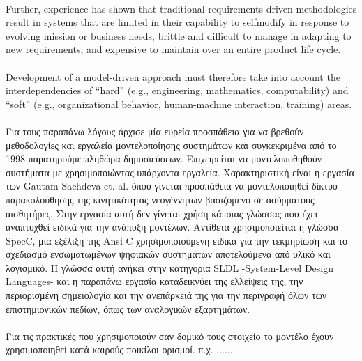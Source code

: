 \documentclass[a4paper,12pt,twoside]{report}
\begin{document}
{			\paragraph{}{Further, experience has shown that traditional requirements-driven methodologies result in systems that are limited in their capability to selfmodify in response to evolving mission or business needs, brittle and difficult to manage in adapting to new requirements, and expensive to maintain over an entire product life cycle.
			}
			
			\paragraph{} {Development of a model-driven approach must therefore take into account the interdependencies of “hard” (e.g., engineering, mathematics, computability) and “soft” (e.g., organizational behavior, human-machine interaction, training) areas. \cite{FoundationalConceptsMDSD}
			}
			
			
						
			\paragraph{} {Για τους παραπάνω λόγους άρχισε μία ευρεία προσπάθεια για να βρεθούν μεθοδολογίες και εργαλεία μοντελοποίησης συστημάτων και συγκεκριμένα από το 1998 παρατηρούμε πληθώρα δημοσιεύσεων. Επιχειρείται να μοντελοποθηθούν συστήματα με χρησιμοποιώντας υπάρχοντα εργαλεία. Χαρακτηριστική είναι η εργασία των Gautam Sachdeva et. al. \cite{SMWirelessSensorNetwork} όπου γίνεται προσπάθεια να μοντελοποιηθεί δίκτυο παρακολούθησης της κινητικότητας νεογέννητων βασιζόμενο σε ασύρματους αισθητήρες. Στην εργασία αυτή δεν γίνεται χρήση κάποιας γλώσσας που έχει αναπτυχθεί ειδικά για την ανάπυξη μοντέλων. Αντίθετα χρησιμοποιείται η γλώσσα SpecC, μία εξέλιξη της Ansi C χρησιμοποιούμενη ειδικά για την τεκμηρίωση και το σχεδιασμό ενσωματωμένων ψηφιακών συστημάτων αποτελούμενα από υλικό και λογισμικό. Η γλώσσα αυτή ανήκει στην κατηγορια SLDL -System-Level Design Languages- και η παραπάνω εργασία καταδεικνύει της ελλείψεις της, την περιορισμένη σημειολογία και την ανεπάρκειά της για την περιγραφή όλων των επιστημιονικών πεδίων, όπως των αναλογικών εξαρτημάτων.
			}
			
			\paragraph{} {Για τις πρακτικές που χρησιμοποιούν σαν δομικό τους στοιχείο το μοντέλο έχουν χρησιμοποιηθεί κατά καιρούς ποικίλοι ορισμοί. π.χ.  \cite{FoundationalConceptsMDSD},.....
			}
			
}
\end{document}
